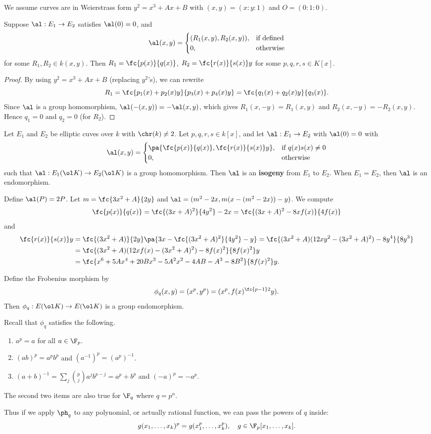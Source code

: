 We assume curves are in Weierstrass form $y^2=x^3+Ax+B$ with $(x,y)=(x:y:1)$ and $O=(0:1:0)$.
\begin{lem}
Suppose $\al:E_1\to E_2$ satisfies $\al(0)=0$, and 
\[
\al(x,y)=\begin{cases}
(R_1(x,y),R_2(x,y)),&\text{if defined}\\
0,&\text{otherwise}
\end{cases}
\]
for some $R_1,R_2\in k(x,y)$. Then $R_1=\fc{p(x)}{q(x)}$, $R_2=\fc{r(x)}{s(x)}y$ for some $p,q,r,s\in K[x]$.
\end{lem}
\begin{proof}
By using $y^2=x^3+Ax+B$ (replacing $y^2$'s), we can rewrite
\[
R_1=\fc{p_1(x)+p_2(x)y}{p_3(x)+p_4(x)y} = \fc{q_1(x)+q_2(x)y}{q_3(x)}.
\]
Since $\al$ is a group homomorphism, $\al(-(x,y))=-\al(x,y)$, which gives $R_1(x,-y)=R_1(x,y)$ and $R_2(x,-y)=-R_2(x,y)$. Hence $q_1=0$ and $q_2=0$ (for $R_2$).
\end{proof}
\begin{df}
Let $E_1$ and $E_2$ be elliptic cuves over $k$ with $\chr(k)\ne 2$. Let $p,q,r,s\in k[x]$, and let $\al:E_1\to E_2$ with $\al(0)=0$ with 
\[
\al(x,y)=\begin{cases}
\pa{\fc{p(x)}{q(x)},\fc{r(x)}{s(x)}y},&\text{if }q(x)s(x)\ne 0\\
0,&\text{otherwise}
\end{cases}
\]
such that $\al:E_1(\ol K)\to E_2(\ol K)$ is a group homomorphism. Then $\al$ is an \textbf{isogeny} from $E_1$ to $E_2$. When $E_1=E_2$, then $\al$ is an endomorphism.
\end{df}
\begin{ex}
Define $\al(P)=2P$. Let $m=\fc{3x^2+A}{2y}$ and $\al=(m^2-2x,m(x-(m^2-2x))-y)$. We compute
\[
\fc{p(x)}{q(x)}=\fc{(3x+A)^2}{4y^2}-2x=\fc{(3x+A)^2-8xf(x)}{4f(x)}
\]
and
\begin{align*}
\fc{r(x)}{s(x)}y&= \fc{(3x^2+A)}{2y} \pa{3x-\fc{(3x^2+A)^2}{4y^2}-y} = \fc{(3x^2+A)(12xy^2-(3x^2+A)^2)-8y^4}{8y^3}\\
&=\fc{(3x^2+A)(12xf(x)-(3x^2+A)^2)-8f(x)^2}{8f(x)^2}y\\
&=\fc{x^6+5Ax^4+20Bx^3-5A^2x^2-4AB -A^3-8B^2}{8f(x)^2}y.
\end{align*}
\end{ex}
\begin{ex}
Define the Frobenius morphism by 
\[
\phi_q(x,y)=(x^p,y^p)=(x^p,f(x)^{\fc{p-1}2}y).
\]
Then $\phi_q:E(\ol K)\to E(\ol K)$ is a group endomorphism.

Recall that $\phi_q$ satisfies the following.
\begin{enumerate}
\item
$a^p=a$ for all $a\in \F_p$.
\item
$(ab)^p=a^pb^p$ and $(a^{-1})^p=(a^p)^{-1}$.
\item
$(a+b)^{-1}=\sum_j \binom pj a^j b^{p-j}=a^p+b^p$ and $(-a)^p=-a^p$.
\end{enumerate}
The second two items are also true for $\F_q$ where $q=p^n$.

Thus if we apply $\ph_q$ to any polynomial, or actually rational function, we can pass the powers of $q$ inside:
\[
g(x_1,\ldots, x_k)^p=g(x_1^p,\ldots, x_k^p),\quad g\in \F_p[x_1,\ldots, x_k].
\]
\end{ex}
